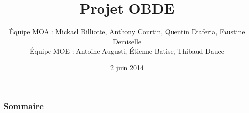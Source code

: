 \documentclass[handout]{beamer}
\title{
	Projet OBDE\\
}
\author{
	Équipe MOA : Mickael Billiotte, Anthony Courtin, Quentin Diaferia, Faustine Demiselle\\
	\vspace{10px}
	Équipe MOE : Antoine Augusti, Étienne Batise,  Thibaud Dauce
}
\date{2 juin 2014}
\begin{document}
	\begin{frame}[plain]
		\titlepage
	\end{frame}

	\begin{frame}[plain]
		\frametitle{Sommaire}
		\tableofcontents
	\end{frame}








\end{document}

